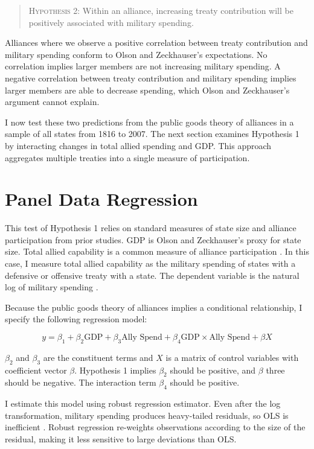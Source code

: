 \documentclass[12pt]{article}
\begin{document}
\begin{quote}
\textsc{Hypothesis 2}: Within an alliance, increasing treaty contribution will be positively associated with military spending. 
\end{quote}


Alliances where we observe a positive correlation between treaty contribution and military spending conform to Olson and Zeckhauser's expectations. 
No correlation implies larger members are not increasing military spending.
A negative correlation between treaty contribution and military spending implies larger members are able to decrease spending, which Olson and Zeckhauser's argument cannot explain. 


I now test these two predictions from the public goods theory of alliances in a sample of all states from 1816 to 2007. 
The next section examines Hypothesis 1 by interacting changes in total allied spending and GDP.
This approach aggregates multiple treaties into a single measure of participation. 


\section{Panel Data Regression}

This test of Hypothesis 1 relies on standard measures of state size and alliance participation from prior studies. 
GDP is Olson and Zeckhauser's proxy for state size. 
Total allied capability is a common measure of alliance participation \citep{Sorokin1994, MorganPalmer2003}. 
In this case, I measure total allied capability as the military spending of states with a defensive or offensive treaty with a state. 
The dependent variable is the natural log of military spending \citep{SingerCINC1988}. 


Because the public goods theory of alliances implies a conditional relationship, I specify the following regression model:

\begin{equation} 
y = \beta_1 + \beta_2 \mbox{GDP} + \beta_3 \mbox{Ally Spend} + \beta_4 \mbox{GDP} \times \mbox{Ally Spend} + \beta X 
\end{equation}


$\beta_2$ and $\beta_3$ are the constituent terms and $X$ is a matrix of control variables with coefficient vector $\beta$.
Hypothesis 1 implies $\beta_2$ should be positive, and $\beta$ three should be negative. 
The interaction term $\beta_4$ should be positive. 


I estimate this model using robust regression estimator. 
Even after the log transformation, military spending produces heavy-tailed residuals, so OLS is inefficient \citep{RaineyBaissa2018}. 
Robust regression re-weights observations according to the size of the residual, making it less sensitive to large deviations than OLS. 
\end{document}
